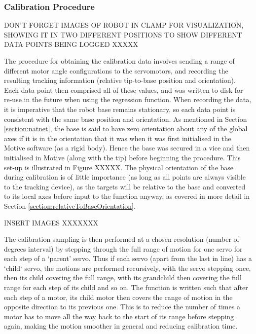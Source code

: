\documentclass[11pt]{article}
\begin{document}
\subsubsection{Calibration Procedure}
\label{section:calibrationProcedure}


DON'T FORGET IMAGES OF ROBOT IN CLAMP FOR VISUALIZATION, SHOWING IT IN TWO DIFFERENT POSITIONS TO SHOW DIFFERENT DATA POINTS BEING LOGGED XXXXX

The procedure for obtaining the calibration data involves sending a range of different motor angle configurations to the servomotors, and recording the resulting tracking information (relative tip-to-base position and orientation). Each data point then comprised all of these values, and was written to disk for re-use in the future when using the regression function. When recording the data, it is imperative that the robot base remains stationary, so each data point is consistent with the same base position and orientation. As mentioned in Section \ref{section:natnet}, the base is said to have zero orientation about any of the global axes if it is in the orientation that it was when it was first initialised in the Motive software (as a rigid body). Hence the base was secured in a vice and then initialised in Motive (along with the tip) before beginning the procedure. This set-up is illustrated in Figure XXXXX. The physical orientation of the base during calibration is of little importance (as long as all points are always visible to the tracking device), as the targets will be relative to the base and converted to its local axes before input to the function anyway, as covered in more detail in Section \ref{section:relativeToBaseOrientation}.

INSERT IMAGES XXXXXXX


The calibration sampling is then performed at a chosen resolution (number of degrees interval) by stepping through the full range of motion for one servo for each step of a `parent' servo. Thus if each servo (apart from the last in line) has a `child` servo, the motions are performed recursively, with the servo stepping once, then its child covering the full range, with its grandchild then covering the full range for each step of its child and so on. The function is written such that after each step of a motor, its child motor then covers the range of motion in the opposite direction to its previous one. This is to reduce the number of times a motor has to move all the way back to the start of its range before stepping again, making the motion smoother in general and reducing calibration time. 
\end{document}
